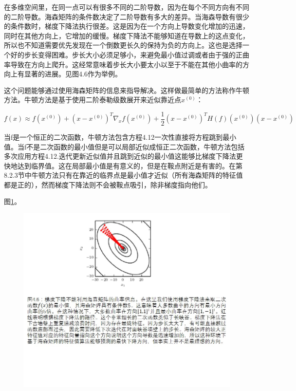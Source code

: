 在多维空间里，在同一点可以有很多不同的二阶导数，因为在每个不同方向有不同的二阶导数。海森矩阵的条件数决定了二阶导数有多大的差异。当海森导数有很少的条件数时，梯度下降法执行很差。这是因为在一个方向上导数变化增加的迅速，同时在其他方向上，它增加的缓慢。梯度下降法不能够知道在导数上的这点变化，所以也不知道需要优先发现在一个倒数更长久的保持为负的方向上。这也是选择一个好的步长变得困难。步长大小必须足够小，来避免最小值过调或者由于强的正曲率导致在方向上爬升。这经常意味着步长大小要太小以至于不能在其他小曲率的方向上有显著的进展。见图4.6作为举例。

这个问题能够通过使用海森矩阵的信息来指导解决。这样做最简单的方法称作牛顿方法。牛顿方法是基于使用二阶泰勒级数展开来近似靠近点$x^{(0)}$：

\begin{equation}
f(x)\approx f(x^{(0)})+(x-x^{(0)})^T\nabla_xf(x^{(0)})+\frac{1}{2}(x-x^{(0)})^TH(f)(x^{(0)})(x-x^{(0)})
\end{equation}

当f是一个恒正的二次函数，牛顿方法包含方程4.12一次性直接将方程跳到最小值。当f不是二次函数的最小值但是可以局部近似成恒正二次函数，牛顿方法包括多次应用方程4.12.迭代更新近似值并且跳到近似的最小值这能够比梯度下降法更快地达到临界值。这在局部最小值是有意义的，但是在鞍点附近是有害的。在第8.2.3节中牛顿方法只有在靠近的临界点是最小值才近似（所有海森矩阵的特征值都是正的），然而梯度下降法则不会被鞍点吸引，除非梯度指向他们。

图\ref{fig:4_6}。
\begin{figure}[htbp] %
   \centering
   \includegraphics[width=6in]{fig/chap4/4_6.jpg} 
   \label{fig:4_6}
\end{figure}

